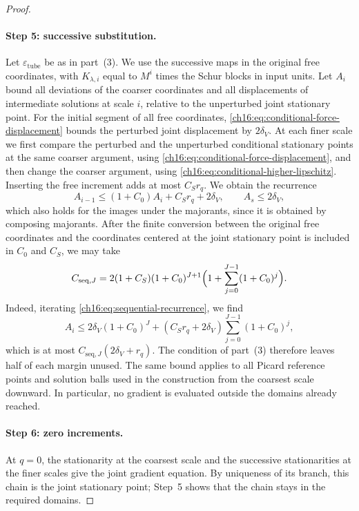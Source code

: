 \begin{proof}
\paragraph{Step 5: successive substitution.}
Let $\varepsilon_{\mathrm{tube}}$ be as in part~(3). We use the successive maps in the original free coordinates, with $K_{\lambda,i}$ equal to $M^i$ times the Schur blocks in input units. Let $A_i$ bound all deviations of the coarser coordinates and all displacements of intermediate solutions at scale $i$, relative to the unperturbed joint stationary point. For the initial segment of all free coordinates, \eqref{ch16:eq:conditional-force-displacement} bounds the perturbed joint displacement by $2\delta_V$. At each finer scale we first compare the perturbed and the unperturbed conditional stationary points at the same coarser argument, using \eqref{ch16:eq:conditional-force-displacement}, and then change the coarser argument, using \eqref{ch16:eq:conditional-higher-lipschitz}. Inserting the free increment adds at most $C_Sr_q$. We obtain the recurrence
\begin{equation}\label{ch16:eq:sequential-recurrence}
 A_{i-1}\le(1+C_0)A_i+C_Sr_q+2\delta_V,
 \qquad A_s\le2\delta_V,
\end{equation}
which also holds for the images under the majorants, since it is obtained by composing majorants. After the finite conversion between the original free coordinates and the coordinates centered at the joint stationary point is included in $C_0$ and $C_S$, we may take
\[
 C_{\mathrm{seq},J}=
 2(1+C_S)(1+C_0)^{J+1}
       \Bigl(1+\sum_{j=0}^{J-1}(1+C_0)^j\Bigr).
\]
Indeed, iterating \eqref{ch16:eq:sequential-recurrence}, we find
\[
 A_i\le2\delta_V(1+C_0)^J+
 (C_Sr_q+2\delta_V)\sum_{j=0}^{J-1}(1+C_0)^j,
\]
which is at most $C_{\mathrm{seq},J}(2\delta_V+r_q)$. The condition of part~(3) therefore leaves half of each margin unused. The same bound applies to all Picard reference points and solution balls used in the construction from the coarsest scale downward. In particular, no gradient is evaluated outside the domains already reached.

\paragraph{Step 6: zero increments.}
At $q=0$, the stationarity at the coarsest scale and the successive stationarities at the finer scales give the joint gradient equation. By uniqueness of its branch, this chain is the joint stationary point; Step~5 shows that the chain stays in the required domains.


\end{proof}
